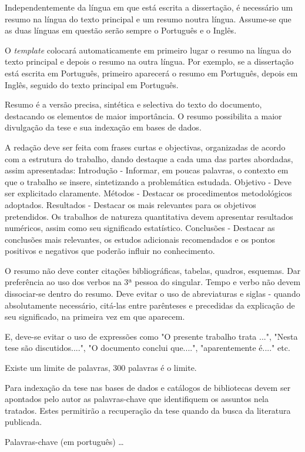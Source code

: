 \abstractPT  %

Independentemente da língua em que está escrita a dissertação, é necessário um resumo na língua do texto principal e um resumo noutra língua.  Assume-se que as duas línguas em questão serão sempre o Português e o Inglês.

O \emph{template} colocará automaticamente em primeiro lugar o resumo na língua do texto principal e depois o resumo na outra língua.  Por exemplo, se a dissertação está escrita em Português, primeiro aparecerá o resumo em Português, depois em Inglês, seguido do texto principal em Português. 

Resumo é a versão precisa, sintética e selectiva do texto do documento, destacando os elementos de maior importância. O resumo possibilita a maior divulgação da tese e sua indexação em bases de dados.

A redação deve ser feita com frases curtas e objectivas, organizadas de acordo com a estrutura do trabalho, dando destaque a cada uma das partes abordadas, assim apresentadas: Introdução - Informar, em poucas palavras, o contexto em que o trabalho se insere, sintetizando a problemática estudada. Objetivo - Deve ser explicitado claramente. Métodos - Destacar os procedimentos metodológicos adoptados. Resultados - Destacar os mais relevantes para os objetivos pretendidos. Os trabalhos de natureza quantitativa devem apresentar resultados numéricos, assim como seu significado estatístico. Conclusões - Destacar as conclusões mais relevantes, os estudos adicionais recomendados e os pontos positivos e negativos que poderão influir no conhecimento. 

O resumo não deve conter citações bibliográficas, tabelas, quadros, esquemas. Dar preferência ao uso dos verbos na 3ª pessoa do singular. Tempo e verbo não devem dissociar-se dentro do resumo. Deve evitar o uso de abreviaturas e siglas - quando absolutamente necessário, citá-las entre parênteses e precedidas da explicação de seu significado, na primeira vez em que aparecem. 

E, deve-se evitar o uso de expressões como "O presente trabalho trata ...", "Nesta tese são discutidos....", "O documento conclui que....", "aparentemente é...." etc. 

Existe um limite de palavras, 300 palavras é o limite.

Para indexação da tese nas bases de dados e catálogos de bibliotecas devem ser apontados pelo autor as palavras-chave que identifiquem os assuntos nela tratados. Estes permitirão a recuperação da tese quando da busca da literatura publicada. 

\begin{keywords}
Palavras-chave (em português) \ldots
\end{keywords}
